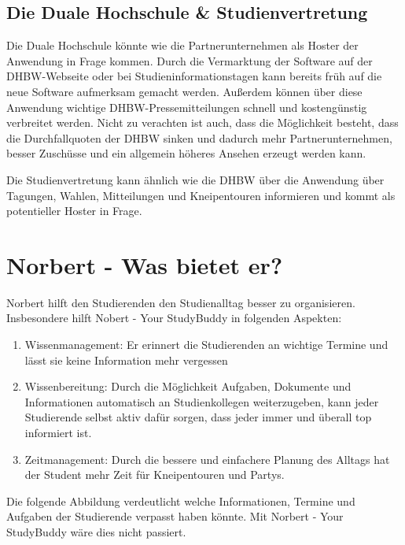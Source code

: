 \subsection{Die Duale Hochschule \& Studienvertretung}
Die Duale Hochschule könnte wie die Partnerunternehmen als Hoster der Anwendung in Frage kommen. Durch die Vermarktung der Software auf der DHBW-Webseite oder bei Studieninformationstagen kann bereits früh auf die neue Software aufmerksam gemacht werden. Außerdem können über diese Anwendung wichtige DHBW-Pressemitteilungen schnell und kostengünstig verbreitet werden. Nicht zu verachten ist auch, dass die Möglichkeit besteht, dass die Durchfallquoten der DHBW sinken und dadurch mehr Partnerunternehmen, besser Zuschüsse und ein allgemein höheres Ansehen erzeugt werden kann.

Die Studienvertretung kann ähnlich wie die DHBW über die Anwendung über Tagungen, Wahlen, Mitteilungen und Kneipentouren informieren und kommt als potentieller Hoster in Frage.

\section{Norbert - Was bietet er?}
Norbert hilft den Studierenden den Studienalltag besser zu organisieren. Insbesondere hilft Nobert - Your StudyBuddy in folgenden Aspekten:
\begin{enumerate}
	\item Wissenmanagement: Er erinnert die Studierenden an wichtige Termine und lässt sie keine Information mehr vergessen
	\item Wissenbereitung: Durch die Möglichkeit Aufgaben, Dokumente und Informationen automatisch an Studienkollegen weiterzugeben, kann jeder Studierende selbst aktiv dafür sorgen, dass jeder immer und überall top informiert ist.
	\item Zeitmanagement: Durch die bessere und einfachere Planung des Alltags hat der Student mehr Zeit für Kneipentouren und Partys.	
\end{enumerate}

Die folgende Abbildung verdeutlicht welche Informationen, Termine und Aufgaben der Studierende verpasst haben könnte. Mit Norbert - Your StudyBuddy wäre dies nicht passiert.

